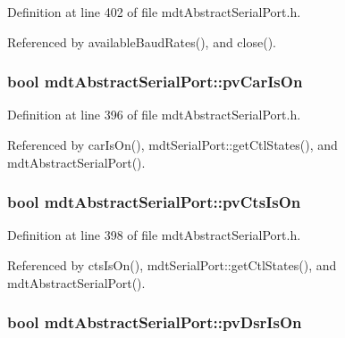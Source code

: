 Definition at line 402 of file mdt\-Abstract\-Serial\-Port.\-h.



Referenced by available\-Baud\-Rates(), and close().

\hypertarget{classmdt_abstract_serial_port_a49907da757ca24c88c0a63275f9a2700}{
\subsubsection[{pv\-Car\-Is\-On}]{\setlength{\rightskip}{0pt plus 5cm}bool mdt\-Abstract\-Serial\-Port\-::pv\-Car\-Is\-On\hspace{0.3cm}{\ttfamily [protected]}}}\label{classmdt_abstract_serial_port_a49907da757ca24c88c0a63275f9a2700}


Definition at line 396 of file mdt\-Abstract\-Serial\-Port.\-h.



Referenced by car\-Is\-On(), mdt\-Serial\-Port\-::get\-Ctl\-States(), and mdt\-Abstract\-Serial\-Port().

\hypertarget{classmdt_abstract_serial_port_a13e6db003256c09f0681a7841e85d6f6}{
\subsubsection[{pv\-Cts\-Is\-On}]{\setlength{\rightskip}{0pt plus 5cm}bool mdt\-Abstract\-Serial\-Port\-::pv\-Cts\-Is\-On\hspace{0.3cm}{\ttfamily [protected]}}}\label{classmdt_abstract_serial_port_a13e6db003256c09f0681a7841e85d6f6}


Definition at line 398 of file mdt\-Abstract\-Serial\-Port.\-h.



Referenced by cts\-Is\-On(), mdt\-Serial\-Port\-::get\-Ctl\-States(), and mdt\-Abstract\-Serial\-Port().

\hypertarget{classmdt_abstract_serial_port_a087bb5791d0341e4e19ca4aab1adf23e}{
\subsubsection[{pv\-Dsr\-Is\-On}]{\setlength{\rightskip}{0pt plus 5cm}bool mdt\-Abstract\-Serial\-Port\-::pv\-Dsr\-Is\-On\hspace{0.3cm}{\ttfamily [protected]}}}\label{classmdt_abstract_serial_port_a087bb5791d0341e4e19ca4aab1adf23e}


